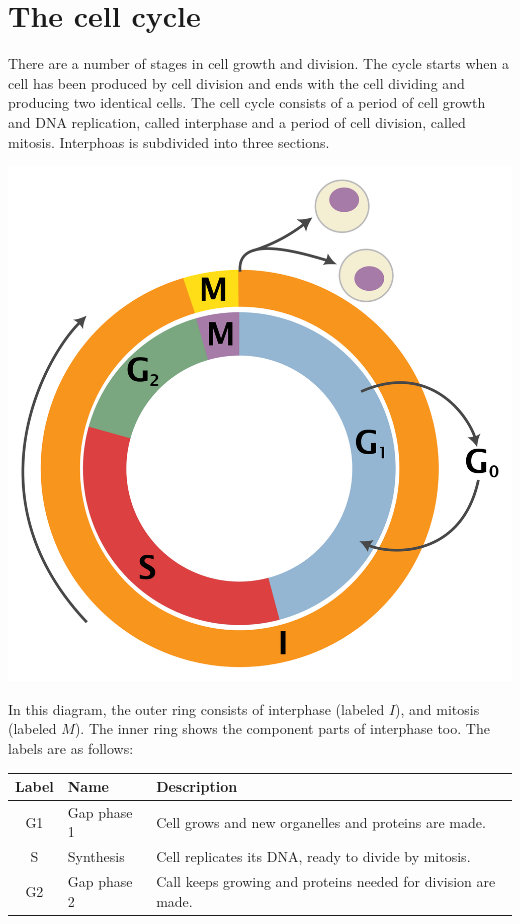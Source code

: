 \documentclass{article}
\begin{document}
\section*{The cell cycle}

There are a number of stages in cell growth and division. The cycle starts when
a cell has been produced by cell division and ends with the cell dividing and
producing two identical cells. The cell cycle consists of a period of cell
growth and DNA replication, called interphase and a period of cell division,
called mitosis. Interphoas is subdivided into three sections.

\begin{center}
	\includegraphics[scale=0.08]{cell_cycle}
\end{center}

In this diagram, the outer ring consists of interphase (labeled $I$), and
mitosis (labeled $M$). The inner ring shows the component parts of interphase
too. The labels are as follows:

\begin{center}
	\begin{tabular}{|c|l|p{5cm}|}

		\hline

		{\bf Label} & {\bf Name} & {\bf Description}\\ \hline

		G1 & Gap phase 1 & Cell grows and new organelles and proteins are
		made.\\ \hline

		S & Synthesis & Cell replicates its DNA, ready to divide by mitosis.\\
		\hline

		G2 & Gap phase 2 & Call keeps growing and proteins needed for division
		are made.\\ \hline

	\end{tabular}
\end{center}
\end{document}
